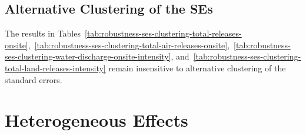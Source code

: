 \documentclass[12pt, english]{article}
\begin{document}
    \subsection{Alternative Clustering of the SEs}\label{subsec:alternative-clustering-of-the-ses}
    The results in Tables~\ref{tab:robustness-ses-clustering-total-releases-onsite},~\ref{tab:robustness-ses-clustering-total-air-releases-onsite},~\ref{tab:robustness-ses-clustering-water-discharge-onsite-intensity}, and~\ref{tab:robustness-ses-clustering-total-land-releases-intensity} remain insensitive to alternative clustering of the standard errors.
    
    
    
    



    \section{Heterogeneous Effects}\label{sec:heterogeneous-effects}
\end{document}
